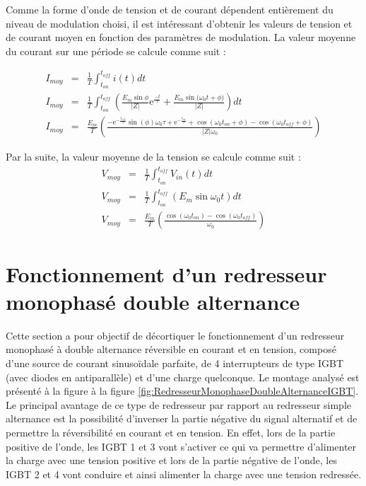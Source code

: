 Comme la forme d'onde de tension et de courant dépendent entièrement du niveau de modulation choisi, il est intéressant d'obtenir les valeurs de tension et de courant moyen en fonction des paramètres de modulation. La valeur moyenne du courant sur une période se calcule comme suit :

\begin{eqnarray}
I_{moy} &=& \frac{1}{T}\int_{t_{on}}^{t_{off}} i(t) dt \\
I_{moy} &=& \frac{1}{T}\int_{t_{on}}^{t_{off}} \left( \frac{E_m\sin{\phi}}{|Z|}\mbox{e}^{\frac{-t}{\tau}} + \frac{E_m\sin{(\omega_0 t + \phi})}{|Z|}\right) dt \\
I_{moy} &=& \frac{E_m}{T} \left( \frac{-\mbox{e}^{-\frac{t_{off}}{\tau}}\sin{(\phi)}\omega_0 \tau + \mbox{e}^{-\frac{t_{on}}{\tau}} + \cos{(\omega_0 t_{on} + \phi)}-\cos{(\omega_0 t_{off} + \phi)}}{|Z|\omega_0} \right)
\end{eqnarray}

Par la suite, la valeur moyenne de la tension se calcule comme suit : 
\begin{eqnarray}
V_{moy} &=& \frac{1}{T}\int_{t_{on}}^{t_{off}} V_{in}(t) dt \\
V_{moy} &=& \frac{1}{T}\int_{t_{on}}^{t_{off}} (E_m \sin{\omega_0 t}) dt \\
V_{moy} &=& \frac{E_m}{T} \left( \frac{\cos{(\omega_0 t_{on})} - \cos{(\omega_0 t_{off})}}{\omega_0} \right)
\end{eqnarray}

\section{Fonctionnement d'un redresseur monophasé double alternance}
Cette section a pour objectif de décortiquer le fonctionnement d'un redresseur monophasé à double alternance réversible en courant et en tension, composé d'une source de courant sinusoïdale parfaite, de 4 interrupteurs de type IGBT (avec diodes en antiparallèle) et d'une charge quelconque. Le montage analysé est présenté à la figure à la figure \ref{fig:RedresseurMonophaseDoubleAlternanceIGBT}. Le principal avantage de ce type de redresseur par rapport au redresseur simple alternance est la possibilité d'inverser la partie négative du signal alternatif et de permettre la réversibilité en courant et en tension. En effet, lors de la partie positive de l'onde, les IGBT 1 et 3 vont s'activer ce qui va permettre d'alimenter la charge avec une tension positive et lors de la partie négative de l'onde, les IGBT 2 et 4 vont conduire et ainsi alimenter la charge avec une tension redressée. 

